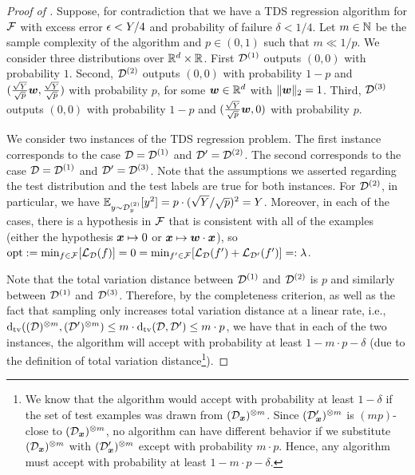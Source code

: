 \begin{proof}[Proof of ]
    Suppose, for contradiction that we have a TDS regression algorithm for ${\mathcal{F}}$ with excess error ${\epsilon} < Y/4$ and probability of failure $\delta<1/4$. Let $m\in {\mathbb{N}}$ be the sample complexity of the algorithm and $p\in(0,1)$ such that $m \ll 1/p$. We consider three distributions over $\mathbb{R}^d\times \mathbb{R}$. First ${\mathcal{D}}^{(1)}$ outputs $(0,0)$ with probability $1$. Second, ${\mathcal{D}}^{(2)}$ outputs $(0,0)$ with probability $1-p$ and $(\frac{\sqrt{Y}}{\sqrt{p}}{\bm{w}}, \frac{\sqrt{Y}}{\sqrt{p}})$ with probability $p$, for some ${\bm{w}}\in\mathbb{R}^d$ with $\|{\bm{w}}\|_2 = 1$. Third, ${\mathcal{D}}^{(3)}$ outputs $(0,0)$ with probability $1-p$ and $(\frac{\sqrt{Y}}{\sqrt{p}}{\bm{w}}, 0)$ with probability $p$.

    We consider two instances of the TDS regression problem. The first instance corresponds to the case ${\mathcal{D}} = {\mathcal{D}}^{(1)}$ and ${\mathcal{D}}' = {\mathcal{D}}^{(2)}$. The second corresponds to the case ${\mathcal{D}} = {\mathcal{D}}^{(1)}$ and ${\mathcal{D}}' = {\mathcal{D}}^{(3)}$. Note that the assumptions we asserted regarding the test distribution and the test labels are true for both instances. For ${\mathcal{D}}^{(2)}$, in particular, we have $\mathbb{E}_{y\sim {\mathcal{D}}^{(2)}_y}[y^2] = p \cdot (\sqrt{Y}/\sqrt{p})^2 = Y$. Moreover, in each of the cases, there is a hypothesis in ${\mathcal{F}}$ that is consistent with all of the examples (either the hypothesis ${\bm{x}}\mapsto 0$ or ${\bm{x}}\mapsto {\bm{w}}\cdot {\bm{x}}$), so $\mathrm{opt}:= \min_{f\in{\mathcal{F}}}[{\mathcal{L}}_{{\mathcal{D}}}(f)] = 0 = \min_{f'\in{\mathcal{F}}}[{\mathcal{L}}_{{\mathcal{D}}}(f')+{\mathcal{L}}_{{\mathcal{D}}'}(f')] =: \lambda$.

    Note that the total variation distance between ${\mathcal{D}}^{(1)}$ and ${\mathcal{D}}^{(2)}$ is $p$ and similarly between ${\mathcal{D}}^{(1)}$ and ${\mathcal{D}}^{(3)}$. Therefore, by the completeness criterion, as well as the fact that sampling only increases total variation distance at a linear rate, i.e., $\mathrm{d}_\mathrm{tv}(({\mathcal{D}})^{\otimes m},({\mathcal{D}}')^{\otimes m}) \le m \cdot \mathrm{d}_\mathrm{tv}({\mathcal{D}},{\mathcal{D}}') \le m\cdot p$, we have that in each of the two instances, the algorithm will accept with probability at least $1-m\cdot p-\delta$ (due to the definition of total variation distance\footnote{We know that the algorithm would accept with probability at least $1-\delta$ if the set of test examples was drawn from $({\mathcal{D}}_{{\bm{x}}})^{\otimes m}$. Since $({\mathcal{D}}_{{\bm{x}}}')^{\otimes m}$ is $(mp)$-close to $({\mathcal{D}}_{{\bm{x}}})^{\otimes m}$, no algorithm can have different behavior if we substitute $({\mathcal{D}}_{{\bm{x}}})^{\otimes m}$ with $({\mathcal{D}}_{{\bm{x}}}')^{\otimes m}$ except with probability $m\cdot p$. Hence, any algorithm must accept with probability at least $1-m\cdot p-\delta$.}).


\end{proof}
